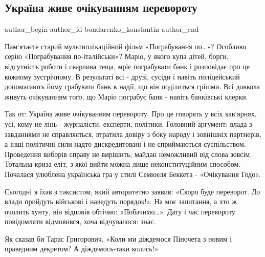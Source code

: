  
 
 
 
 
 
\subsection{Україна живе очікуванням перевороту}
\label{sec:23_10_2021.fb.bondarenko_konstantin.1.ozhidanie_perevorot}
 
\ifcmt
 author_begin
   author_id bondarenko_konstantin
 author_end
\fi

Пам‘ятаєте старий мультиплікаційний фільм «Пограбування по…»? Особливо серію
«Пограбування по-італійськи»? Маріо, у якого купа дітей, борги, відсутність
роботи і сварлива теща, мріє пограбувати банк і розповідає про це кожному
зустрічному. В результаті всі - друзі, сусіди і навіть поліцейський допомагають
йому грабувати банк в надії, що він поділиться грішми. Всі довкола живуть
очікуванням того, що Маріо пограбує банк - навіть банківські клерки. 

Так от: Україна живе очікуванням перевороту. Про це говорять у всіх кав‘ярнях,
усі, кому не лінь - журналісти, експерти, політики. Головний аргумент: влада з
завданнями не справляється, втратила довіру з боку народу і зовнішніх
партнерів, а інші політичні сили надто дискредитовані і не сприймаються
суспільством. Проведення виборів справу не вирішить, майдан неможливий від
слова зовсім. Тотальна криза еліт, з якої вийти можна лише неконституційним
способом. Почалася улюблена українська гра у стилі Семюеля Беккета -
«Очікування Годо». 

Сьогодні я їхав з таксистом, який авторитетно заявив: «Скоро буде переворот. До
влади прийдуть військові і наведуть порядок!». На моє запитання, а хто ж
очолить хунту, він відповів обтічно: «Побачимо…». Дату і час перевороту
повідомляти відмовився, хоча відчувалося: знає. 

Як сказав би Тарас Григорович, «Коли ми діждемося Піночета з новим і праведним
декретом? А діждемось-таки колись!»

